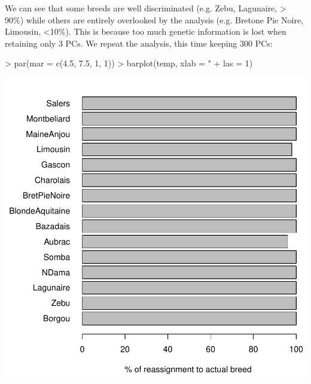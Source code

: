 \documentclass{article}
\begin{document}
\noindent
We can see that some breeds are well discriminated (e.g. Zebu, Lagunaire,  > 90\%) while others are
entirely overlooked by the analysis (e.g. Bretone Pie Noire, Limousin, <10\%).
This is because too much genetic information is lost when retaining only 3 PCs.
We repeat the analysis, this time keeping 300 PCs:
\begin{Schunk}
\end{Schunk}
\begin{Schunk}
\begin{Sinput}
> par(mar = c(4.5, 7.5, 1, 1))
> barplot(temp, xlab = "%
+     las = 1)
\end{Sinput}
\end{Schunk}
\includegraphics{figs/dapc-029}
\end{document}

